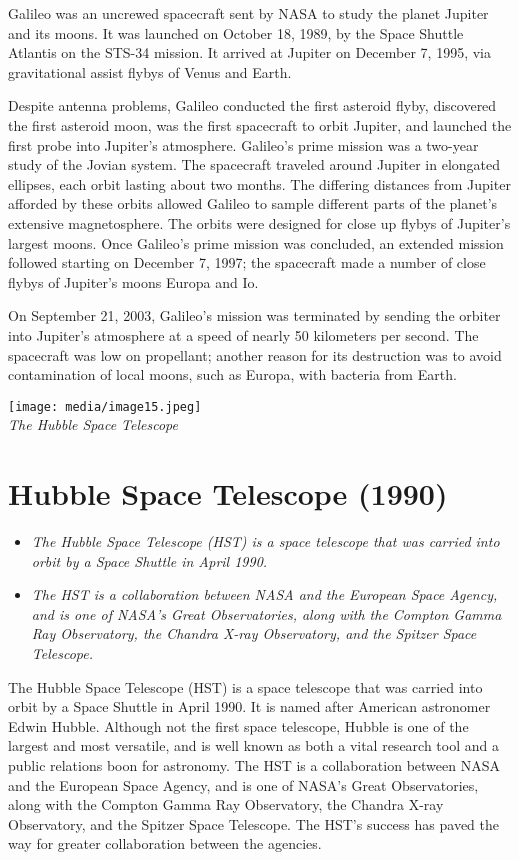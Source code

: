 Galileo was an uncrewed spacecraft sent by NASA to study the planet
Jupiter and its moons. It was launched on October 18, 1989, by the Space
Shuttle Atlantis on the STS-34 mission. It arrived at Jupiter on
December 7, 1995, via gravitational assist flybys of Venus and Earth.

Despite antenna problems, Galileo conducted the first asteroid flyby,
discovered the first asteroid moon, was the first spacecraft to orbit
Jupiter, and launched the first probe into Jupiter's atmosphere.
Galileo's prime mission was a two-year study of the Jovian system. The
spacecraft traveled around Jupiter in elongated ellipses, each orbit
lasting about two months. The differing distances from Jupiter afforded
by these orbits allowed Galileo to sample different parts of the
planet's extensive magnetosphere. The orbits were designed for close up
flybys of Jupiter's largest moons. Once Galileo's prime mission was
concluded, an extended mission followed starting on December 7, 1997;
the spacecraft made a number of close flybys of Jupiter's moons Europa
and Io.

On September 21, 2003, Galileo's mission was terminated by sending the
orbiter into Jupiter's atmosphere at a speed of nearly 50 kilometers per
second. The spacecraft was low on propellant; another reason for its
destruction was to avoid contamination of local moons, such as Europa,
with bacteria from Earth.

\texttt{[image: media/image15.jpeg]}\\
\emph{The Hubble Space Telescope}

\section{Hubble Space Telescope
(1990)}\label{hubble-space-telescope-1990}

\begin{itemize}
\item
  \emph{The Hubble Space Telescope (HST) is a space telescope that was
  carried into orbit by a Space Shuttle in April 1990.}
\item
  \emph{The HST is a collaboration between NASA and the European Space
  Agency, and is one of NASA's Great Observatories, along with the
  Compton Gamma Ray Observatory, the Chandra X-ray Observatory, and the
  Spitzer Space Telescope.}
\end{itemize}

The Hubble Space Telescope (HST) is a space telescope that was carried
into orbit by a Space Shuttle in April 1990. It is named after American
astronomer Edwin Hubble. Although not the first space telescope, Hubble
is one of the largest and most versatile, and is well known as both a
vital research tool and a public relations boon for astronomy. The HST
is a collaboration between NASA and the European Space Agency, and is
one of NASA's Great Observatories, along with the Compton Gamma Ray
Observatory, the Chandra X-ray Observatory, and the Spitzer Space
Telescope. The HST's success has paved the way for greater collaboration
between the agencies.

